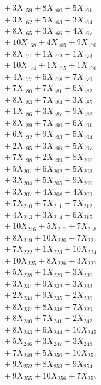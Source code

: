 \documentclass[a4paper,10pt]{article}
\begin{document}
{\begin{align}
&\;  + 3 X_{159} + 8 X_{160} + 5 X_{161} \\[0.5ex]\allowbreak
&\;  + 3 X_{162} + 5 X_{163} + 3 X_{164} \\[0.3ex]
&\;  + 8 X_{165} + 3 X_{166} + 4 X_{167} \\[0.3ex]
&\;  + 10 X_{168} + 4 X_{169} + 9 X_{170} \\[0.3ex]
&\;  + 8 X_{171} + 1 X_{172} + 1 X_{173} \\[0.3ex]
&\;  + 10 X_{174} + 1 X_{175} + 1 X_{176} \\[0.3ex]
&\;  + 4 X_{177} + 6 X_{178} + 7 X_{179} \\[0.3ex]
&\;  + 7 X_{180} + 7 X_{181} + 6 X_{182} \\[0.3ex]
&\;  + 8 X_{183} + 7 X_{184} + 3 X_{185} \\[0.3ex]
&\;  + 1 X_{186} + 3 X_{187} + 9 X_{188} \\[0.3ex]
&\;  + 8 X_{189} + 7 X_{190} + 6 X_{191} \\[0.5ex]\allowbreak
&\;  + 6 X_{192} + 9 X_{193} + 5 X_{194} \\[0.3ex]
&\;  + 2 X_{195} + 3 X_{196} + 5 X_{197} \\[0.3ex]
&\;  + 7 X_{198} + 2 X_{199} + 8 X_{200} \\[0.3ex]
&\;  + 5 X_{201} + 6 X_{202} + 5 X_{203} \\[0.3ex]
&\;  + 3 X_{204} + 5 X_{205} + 9 X_{206} \\[0.3ex]
&\;  + 3 X_{207} + 4 X_{208} + 4 X_{209} \\[0.3ex]
&\;  + 7 X_{210} + 7 X_{211} + 7 X_{212} \\[0.3ex]
&\;  + 4 X_{213} + 3 X_{214} + 6 X_{215} \\[0.3ex]
&\;  + 10 X_{216} + 5 X_{217} + 7 X_{218} \\[0.3ex]
&\;  + 8 X_{219} + 10 X_{220} + 7 X_{221} \\[0.5ex]\allowbreak
&\;  + 7 X_{222} + 1 X_{223} + 10 X_{224} \\[0.3ex]
&\;  + 10 X_{225} + 8 X_{226} + 3 X_{227} \\[0.3ex]
&\;  + 5 X_{228} + 1 X_{229} + 3 X_{230} \\[0.3ex]
&\;  + 3 X_{231} + 9 X_{232} + 3 X_{233} \\[0.3ex]
&\;  + 2 X_{234} + 9 X_{235} + 2 X_{236} \\[0.3ex]
&\;  + 8 X_{237} + 8 X_{238} + 7 X_{239} \\[0.3ex]
&\;  + 8 X_{240} + 7 X_{241} + 2 X_{242} \\[0.3ex]
&\;  + 8 X_{243} + 6 X_{244} + 10 X_{245} \\[0.3ex]
&\;  + 5 X_{246} + 3 X_{247} + 3 X_{248} \\[0.3ex]
&\;  + 7 X_{249} + 5 X_{250} + 10 X_{251} \\[0.5ex]\allowbreak
&\;  + 9 X_{252} + 8 X_{253} + 9 X_{254} \\[0.3ex]
&\;  + 9 X_{255} + 10 X_{256} + 7 X_{257}\nonumber
\end{align}
}
\end{document}
